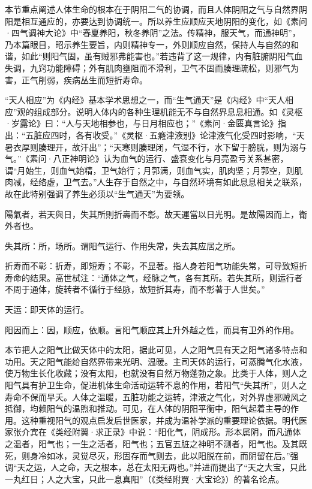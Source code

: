 \documentclass[draft,12pt]{ctexbook}
\begin{document}


本节重点阐述人体生命的根本在于阴阳二气的协调，而且人体阴阳之气与自然界阴阳是相互通应的，亦要达到协调统一。所以养生应顺应天地阴阳的变化，如《素问·四气调神大论》中“春夏养阳，秋冬养阴”之法。传精神，服天气，而通神明”，乃本篇眼目，昭示养生要旨，内则精神专一，外则顺应自然，保持人与自然的和谐，如此“则阳气固，虽有贼邪弗能害也。”若违背了这一规律，内有脏腑阴阳气血失调，九窍功能障碍；外有肌肉壅阻而不滑利，卫气不固而腠理疏松，则邪气为害，正气削弱，疾病丛生而短折寿命。

“天人相应”为《内经》基本学术思想之一，而“生气通天”是《内经》中“天人相应”观的组成部分。说明人体内的各种生理机能无不与自然界息息相通。如《灵枢·岁露论》曰：“人与天地相参也，与日月相应也；”《素问·金匮真言论》指出：“五脏应四时，各有收受。”《灵枢·五癃津液别》论津液气化受四时影响，“天暑衣厚则腠理开，故汗出”；“天寒则腠理闭，气湿不行，水下留于膀胱，则为溺与气。”《素问·八正神明论》认为血气的运行、盛衰变化与月亮盈亏关系甚密，谓“月始生，则血气始精，卫气始行；月郭满，则血气实，肌肉坚；月郭空，则肌肉减，经络虚，卫气去。”人生存于自然之中，与自然环境有如此息息相关之联系，故在此特别强调了养生必须以“生气通天”为要领。


\begin{yuanwen}
陽氣者，若天與日，失其所則折壽而不彰。故天運當以日光明。是故陽因而上，衛外者也。
\end{yuanwen}


\begin{jiaozhu}
  \item 失其所：所，场所。谓阳气运行、作用失常，失去其应居之所。
  \item 折寿而不彰：折寿，即短寿；不彰，不显著。指人身若阳气功能失常，可导致短折寿命的结果。高世栻注：“通体之气，经脉之气，各有其所。若失其所，则运行者不周于通体，旋转者不循行于经脉，故短折其寿，而不彰著于人世矣。”
  \item 天运：即天体的运行。
  \item 阳因而上：因，顺应，依顺。言阳气顺应其上升外越之性，而具有卫外的作用。
\end{jiaozhu}



本节把人之阳气比做天体中的太阳，据此可见，人之阳气具有天之阳气诸多特点和功用。天之阳气能给自然界带来光明、温暖。主司天体的运行，可蒸腾气化水液，使万物生长化收藏；没有太阳，也就没有自然万物蓬勃之象。比类于人体，则人之阳气具有护卫生命，促进机体生命活动运转不息的作用，若阳气“失其所”，则人之寿命不保而早夭。人体之温暖，五脏功能之运转，津液之气化，对外界虚邪贼风之抵御，均赖阳气的温煦和推动。可见，在人体的阴阳平衡中，阳气起着主导的作用。这种重视阳气的观点启发后世医家，并成为温补学派的重要理论依据。明代医家张介宾在《类经附翼·求正录》中说：“阳化气，阴成形。形本属阴，而凡通体之温者，阳气也；一生之活者，阳气也；五官五脏之神明不测者，阳气也。及其既死，则身冷如冰，灵觉尽灭，形固存而气则去，此以阳脱在前，而阴留在后。”强调“天之运，人之命，天之根本，总在太阳无两也。”并进而提出了“天之大宝，只此一丸红日；人之大宝，只此一息真阳”（《类经附翼·大宝论》）的著名论点。
\end{document}
